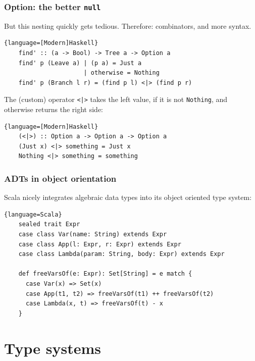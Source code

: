 \documentclass{beamer}
\begin{document}
\begin{frame}[containsverbatim]
  \frametitle{Option: the better \texttt{null}} 

  But this nesting quickly gets tedious. Therefore: combinators, and more syntax.

  \begin{lstlisting}{language=[Modern]Haskell}
    find' :: (a -> Bool) -> Tree a -> Option a
    find' p (Leave a) | (p a) = Just a
                      | otherwise = Nothing
    find' p (Branch l r) = (find p l) <|> (find p r)
  \end{lstlisting}

  The (custom) operator \lstinline$<|>$ takes the left value, if it is not \lstinline|Nothing|, and
  otherwise returns the right side:

    \begin{lstlisting}{language=[Modern]Haskell}
    (<|>) :: Option a -> Option a -> Option a
    (Just x) <|> something = Just x
    Nothing <|> something = something
  \end{lstlisting}
\end{frame}

\begin{frame}[containsverbatim]
  \frametitle{ADTs in object orientation} 

  Scala nicely integrates algebraic data types into its object oriented type system:

  \begin{lstlisting}{language=Scala}
    sealed trait Expr
    case class Var(name: String) extends Expr
    case class App(l: Expr, r: Expr) extends Expr
    case class Lambda(param: String, body: Expr) extends Expr

    def freeVarsOf(e: Expr): Set[String] = e match {
      case Var(x) => Set(x)
      case App(t1, t2) => freeVarsOf(t1) ++ freeVarsOf(t2)
      case Lambda(x, t) => freeVarsOf(t) - x
    }
  \end{lstlisting}
\end{frame}


\section{Type systems}
\end{document}
